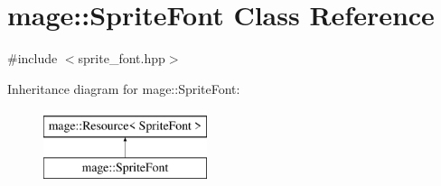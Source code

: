 \hypertarget{classmage_1_1_sprite_font}{}\section{mage\+:\+:Sprite\+Font Class Reference}
\label{classmage_1_1_sprite_font}


{\ttfamily \#include $<$sprite\+\_\+font.\+hpp$>$}

Inheritance diagram for mage\+:\+:Sprite\+Font\+:\begin{figure}[H]
\begin{center}
\leavevmode
\includegraphics[height=2.000000cm]{classmage_1_1_sprite_font}
\end{center}
\end{figure}
